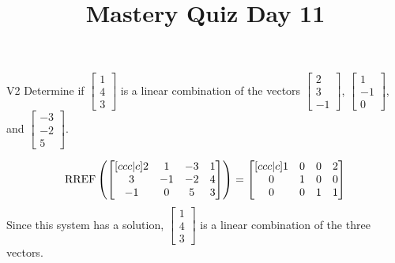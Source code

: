 \documentclass{sbgLAquiz}
\title{Mastery Quiz Day 11 }
\begin{document}
\begin{problem}{V2}
Determine if $\begin{bmatrix} 1 \\ 4 \\ 3 \end{bmatrix}$ is a linear combination of the vectors $\begin{bmatrix} 2 \\ 3 \\ -1 \end{bmatrix}$, $\begin{bmatrix} 1 \\ -1 \\ 0 \end{bmatrix}$, and $\begin{bmatrix} -3 \\ -2 \\ 5 \end{bmatrix}$.
\end{problem}
\begin{solution}
$$\operatorname{RREF}\left( \begin{bmatrix}[ccc|c] 2 & 1 & -3  & 1 \\ 3 & -1 & -2 & 4 \\ -1 & 0 & 5 & 3 \end{bmatrix} \right) = \begin{bmatrix}[ccc|c] 1 & 0 & 0 & 2 \\ 0 & 1 & 0 & 0 \\ 0 & 0 &  1 & 1 \end{bmatrix}$$
Since this system has a solution,  $\begin{bmatrix} 1 \\ 4 \\ 3 \end{bmatrix}$ is a linear combination of the three vectors.
\end{solution}
\end{document}
